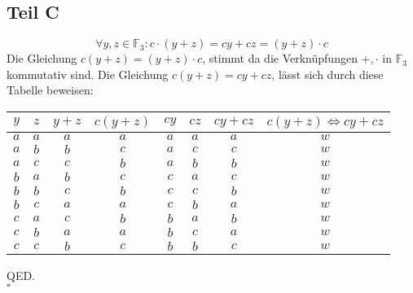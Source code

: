 \documentclass[a4paper,tikz]{article}
\newcommand*{\QED}{\null\nobreak\hfill\ensuremath{\square}}%
\begin{document}
\subsection{Teil C}
\[\forall y,z \in \mathbb{F}_3 : c \cdot (y+z) = cy+cz = (y+z) \cdot c\]
Die Gleichung $c(y+z) = (y+z) \cdot c$, stimmt da die Verknüpfungen $+,\cdot$ in $\mathbb{F}_3$ kommutativ sind. Die Gleichung $c(y+z) = cy + cz$, lässt sich durch diese Tabelle beweisen:

\begin{center}
\begin{tabular}{ c|c|c|c|c|c|c|c } 
 $y$ & $z$ & $y+z$ & $c(y+z)$ & $cy$ & $cz$ & $cy + cz$ & $c(y+z) \Longleftrightarrow cy + cz$ \\
 \hline
 $a$ & $a$ & $a$ & $a$ & $a$ & $a$ & $a$ & $w$ \\
 $a$ & $b$ & $b$ & $c$ & $a$ & $c$ & $c$ & $w$ \\
 $a$ & $c$ & $c$ & $b$ & $a$ & $b$ & $b$ & $w$ \\
 $b$ & $a$ & $b$ & $c$ & $c$ & $a$ & $c$ & $w$ \\
 $b$ & $b$ & $c$ & $b$ & $c$ & $c$ & $b$ & $w$ \\
 $b$ & $c$ & $a$ & $a$ & $c$ & $b$ & $a$ & $w$ \\
 $c$ & $a$ & $c$ & $b$ & $b$ & $a$ & $b$ & $w$ \\
 $c$ & $b$ & $a$ & $a$ & $b$ & $c$ & $a$ & $w$ \\
 $c$ & $c$ & $b$ & $c$ & $b$ & $b$ & $c$ & $w$ \\
\end{tabular}
\end{center}

 QED.\\
 \QED
\end{document}
